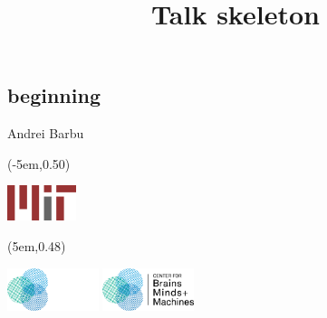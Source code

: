 



\title[skeleton]{Talk skeleton}

\author[Andrei Barbu]{}

\institute[MIT]{}

\date[August, 2018]{}


\lsstyle

\subsection{beginning}
\begin{frame}[plain]
  \titlepage
  \begin{center}
    \vspace{3ex}
    Andrei Barbu
    \begin{textblock*}{\paperwidth}(-5em,0.50\textheight)
      \begin{footnotesize}
        \includegraphics[width=0.15\textwidth]{../images/logo-mit}
      \end{footnotesize}
    \end{textblock*}
    \begin{textblock*}{\paperwidth}(5em,0.48\textheight)
      \begin{footnotesize}
        \ifdefined\darkmode
        \includegraphics[width=0.2\textwidth]{../images/cbmm-logo-inverted}
        \else
        \includegraphics[width=0.2\textwidth]{../images/cbmm-logo}
        \fi
      \end{footnotesize}
    \end{textblock*}
  \end{center}
\end{frame}

\begin{frame}[plain]
  \centering
\end{frame}


